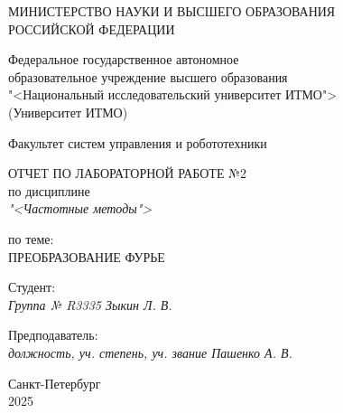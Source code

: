 \thispagestyle{empty}

\begin{center}
    МИНИСТЕРСТВО НАУКИ И ВЫСШЕГО ОБРАЗОВАНИЯ \\ РОССИЙСКОЙ ФЕДЕРАЦИИ

    \vspace{20pt}

    Федеральное государственное автономное \\ образовательное учреждение высшего образования \\
    "<Национальный исследовательский университет ИТМО"> \\
    (Университет ИТМО)

    \vspace{20pt}

    Факультет систем управления и робототехники
\end{center}

\vfill

\begin{center}
    ОТЧЕТ ПО ЛАБОРАТОРНОЙ РАБОТЕ №2\\  
    по дисциплине \\
    \textit{"<Частотные методы">}

    \vspace{20pt}

    по теме: \\
    \uppercase{Преобразование Фурье}
\end{center}

\vfill

    \noindent Студент: \\
    \textit{Группа № R3335 \hfill Зыкин Л. В.}

    \vspace{20pt}

    \noindent Предподаватель: \\
    \textit{должность, уч. степень, уч. звание \hfill Пашенко А. В.}

\vfill

\begin{center}
    Санкт-Петербург \\ 2025
\end{center}